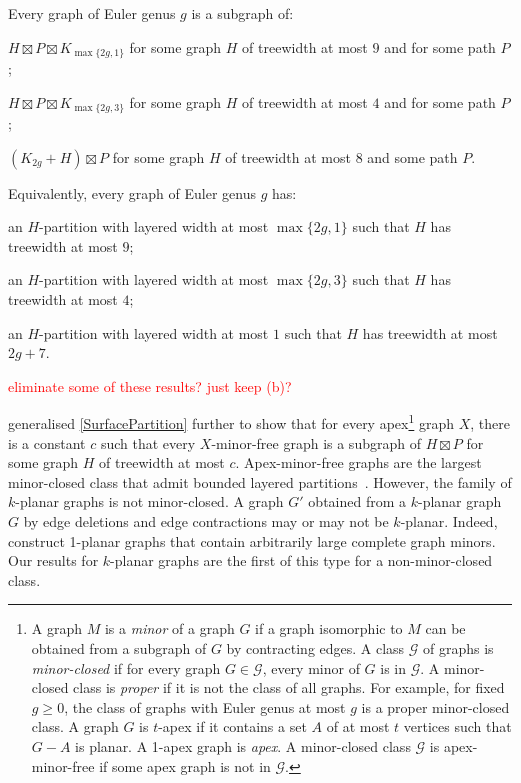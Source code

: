 \documentclass{patmorin}
\renewcommand{\geq}{\geqslant}
\begin{document}
\begin{thm}
\label{SurfacePartition}
Every graph of Euler genus $g$ is a subgraph of:
\begin{compactenum}[(a)]
\item  $H \boxtimes P \boxtimes K_{\max\{2g,1\}}$ for some graph $H$ of treewidth at most $9$ and for some path $P$;
\item  $H \boxtimes P \boxtimes K_{\max\{2g,3\}}$ for some graph $H$ of treewidth at most $4$ and for some path $P$;
\item $(K_{2g} + H )  \boxtimes P$ for some graph $H$ of treewidth at most $8$  and some path $P$. 
\end{compactenum}
Equivalently, every graph of Euler genus $g$ has:
\begin{compactenum}[(a)]
\item an $H$-partition with layered width at most $\max\{2g,1\}$ such that $H$ has treewidth at most $9$;
\item an $H$-partition with layered width at most $\max\{2g,3\}$ such that $H$ has treewidth at most $4$; 
\item an $H$-partition with layered width at most $1$ such that $H$ has treewidth at most $2g+7$. 
\end{compactenum}
\textcolor{red}{eliminate some of these results? just keep (b)? }
\end{thm}

\citet{dujmovic.joret.ea:planar} generalised \cref{SurfacePartition} further to show that for every apex\footnote{A graph $M$ is a \textit{minor} of a graph $G$ if a graph isomorphic to $M$ can be obtained from a subgraph of $G$ by contracting edges. A class $\mathcal{G}$ of graphs is \emph{minor-closed} if for every graph $G\in\mathcal{G}$, every minor of $G$ is in $\mathcal{G}$. A minor-closed class is \emph{proper} if it is not the class of all graphs. For example, for fixed $g\geq 0$, the class of graphs with Euler genus at most $g$ is a proper minor-closed class. A graph $G$ is $t$-apex if it contains a set $A$ of at most $t$ vertices such that $G-A$ is planar. A 1-apex graph is \emph{apex}.  A minor-closed class $\mathcal{G}$ is apex-minor-free if some apex graph is not in $\mathcal{G}$.}
 graph $X$, there is a constant $c$ such that every $X$-minor-free graph is a subgraph of $H\boxtimes P$ for some graph $H$ of treewidth at most $c$. Apex-minor-free graphs are the largest minor-closed class that admit bounded layered partitions~\citep{dujmovic.joret.ea:planar}. However, the family of $k$-planar graphs is not minor-closed.  A graph $G'$ obtained from a $k$-planar graph $G$ by edge deletions and edge contractions may or may not be $k$-planar. Indeed, \citet{dujmovic.eppstein.ea:structure} construct 1-planar graphs that contain arbitrarily large complete graph minors. Our results for $k$-planar graphs are the first of this type for a non-minor-closed class. 
\end{document}
